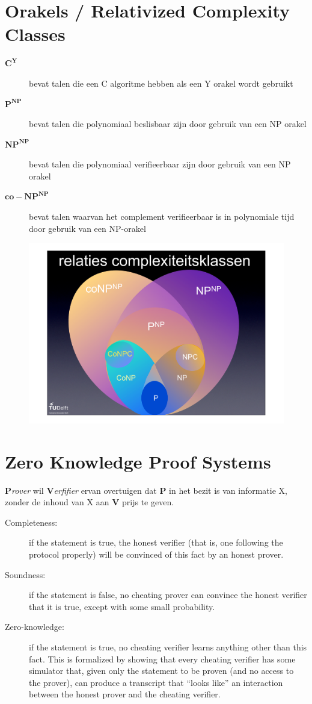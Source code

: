 \documentclass[]{article}
\begin{document}
\section*{Orakels / Relativized Complexity Classes}

\begin{description}
\item[$\mathbf{C^Y}$] bevat talen die een C algoritme hebben als een Y orakel wordt gebruikt
\item[$\mathbf{P^{NP}}$] bevat talen die polynomiaal beslisbaar zijn door gebruik van een NP orakel 
\item[$\mathbf{NP^{NP}}$] bevat talen die polynomiaal verifieerbaar zijn door gebruik van een NP orakel 
\item[$\mathbf{co-NP^{NP}}$] bevat talen waarvan het complement verifieerbaar is in polynomiale tijd door gebruik van een NP-orakel
\end{description}

\begin{figure}[H]
\centering
\includegraphics[width=0.6\columnwidth]{slides/orakel-klassen}
\end{figure}

\section*{Zero Knowledge Proof Systems}

\textbf{P}\textit{rover} wil \textbf{V}\textit{erfifier} ervan overtuigen dat \textbf{P} in het bezit is van informatie X, zonder de inhoud van X aan \textbf{V} prijs te geven.

\begin{description}
\item[Completeness:] if the statement is true, the honest verifier (that is, one following the protocol properly) will be convinced of this fact by an honest prover.
\item[Soundness:] if the statement is false, no cheating prover can convince the honest verifier that it is true, except with some small probability.
\item[Zero-knowledge:] if the statement is true, no cheating verifier learns anything other than this fact. This is formalized by showing that every cheating verifier has some simulator that, given only the statement to be proven (and no access to the prover), can produce a transcript that ``looks like'' an interaction between the honest prover and the cheating verifier.
\end{description}
\end{document}
